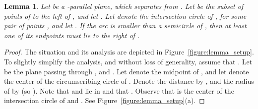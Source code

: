 \documentclass[a4paper,12pt]{article}
\newtheorem{lemma}[theorem]{Lemma}
\begin{document}
\begin{lemma}
\label{lemma:quadratic_K_P_L}
Let  be a -parallel plane, which separates  from .
Let  be the subset of points of  to the left of , and let .
Let  denote the intersection circle of , for some pair of points , and let . If the arc  is smaller than a semicircle of , then at least one of its endpoints must lie to the right of .
\end{lemma}

\begin{proof}The situation and its analysis are depicted in Figure~\ref{figure:lemma_setup}. To slightly simplify the analysis, and without loss of generality, assume that . Let  be the plane passing through ,  and . Let 
denote the midpoint of , and let  denote the center of the
circumscribing circle  of . Denote the distance 
by , and the radius of  by  (so ).
Note that  and  lie in  and that .
Observe that  is the center of the intersection circle  of
 and . See Figure~\ref{figure:lemma_setup}(a).


\end{proof}
\end{document}
